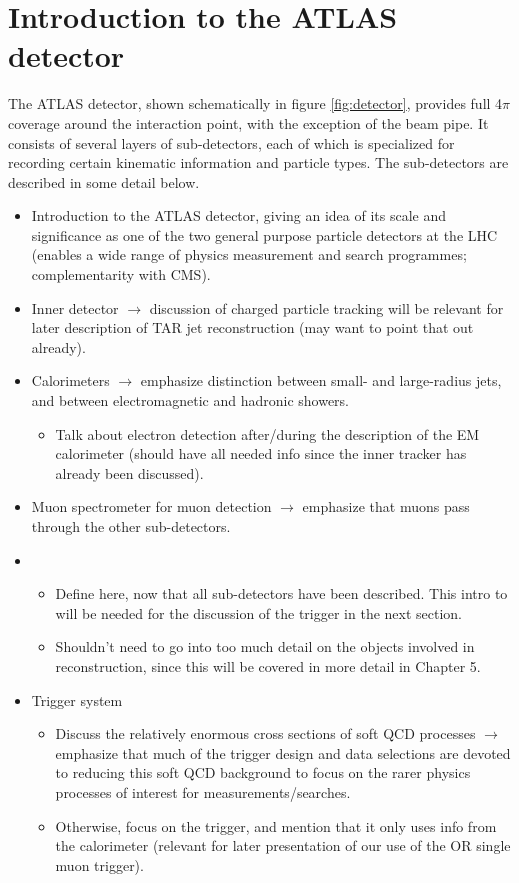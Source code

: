 \section{Introduction to the ATLAS detector}

The ATLAS detector, shown schematically in figure \ref{fig:detector}, provides full 4$\pi$ coverage around the interaction point, with the exception of the beam pipe. It consists of several layers of sub-detectors, each of which is specialized for recording certain kinematic information and particle types. The sub-detectors are described in some detail below. 

\begin{itemize}
\item Introduction to the ATLAS detector, giving an idea of its scale and significance as one of the two general purpose particle detectors at the LHC (enables a wide range of physics measurement and search programmes; complementarity with CMS).
\item Inner detector $\rightarrow$ discussion of charged particle tracking will be relevant for later description of TAR jet reconstruction (may want to point that out already).
\item Calorimeters $\rightarrow$ emphasize distinction between small- and large-radius jets, and between electromagnetic and hadronic showers. 
\begin{itemize}
\item Talk about electron detection after/during the description of the EM calorimeter (should have all needed info since the inner tracker has already been discussed). 
\end{itemize}
\item Muon spectrometer for muon detection $\rightarrow$ emphasize that muons pass through the other sub-detectors. 
\item \met 
\begin{itemize}
\item Define \met here, now that all sub-detectors have been described. This intro to \met will be needed for the discussion of the \met trigger in the next section.
\item Shouldn't need to go into too much detail on the objects involved in \met reconstruction, since this will be covered in more detail in Chapter 5.
\end{itemize}
\item Trigger system 
\begin{itemize}
\item Discuss the relatively enormous cross sections of soft QCD processes $\rightarrow$ emphasize that much of the trigger design and data selections are devoted to reducing this soft QCD background to focus on the rarer physics processes of interest for measurements/searches. 
\item Otherwise, focus on the \met trigger, and mention that it only uses info from the calorimeter (relevant for later presentation of our use of the \met OR single muon trigger).
\end{itemize}
\end{itemize}
